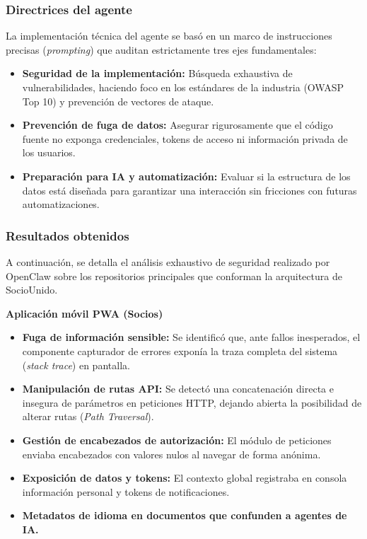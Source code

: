 \documentclass[conference, a4paper]{IEEEtran}
\begin{document}
\subsubsection{Directrices del agente}
La implementaci\'on t\'ecnica del agente se bas\'o en un marco de instrucciones precisas (\textit{prompting}) que auditan estrictamente tres ejes fundamentales:
\begin{itemize}
    \item \textbf{Seguridad de la implementaci\'on:} B\'usqueda exhaustiva de vulnerabilidades, haciendo foco en los est\'andares de la industria (OWASP Top 10) y prevenci\'on de vectores de ataque.
    \item \textbf{Prevenci\'on de fuga de datos:} Asegurar rigurosamente que el c\'odigo fuente no exponga credenciales, tokens de acceso ni informaci\'on privada de los usuarios.
    \item \textbf{Preparaci\'on para IA y automatizaci\'on:} Evaluar si la estructura de los datos est\'a dise\~nada para garantizar una interacci\'on sin fricciones con futuras automatizaciones.
\end{itemize}

\subsubsection{Resultados obtenidos}
A continuaci\'on, se detalla el an\'alisis exhaustivo de seguridad realizado por OpenClaw sobre los repositorios principales que conforman la arquitectura de SocioUnido.

\noindent \textbf{Aplicaci\'on m\'ovil PWA (Socios)}
\begin{itemize}
    \item \textbf{Fuga de informaci\'on sensible:} Se identific\'o que, ante fallos inesperados, el componente capturador de errores expon\'ia la traza completa del sistema (\textit{stack trace}) en pantalla.
    \item \textbf{Manipulaci\'on de rutas API:} Se detect\'o una concatenaci\'on directa e insegura de par\'ametros en peticiones HTTP, dejando abierta la posibilidad de alterar rutas (\textit{Path Traversal}).
    \item \textbf{Gesti\'on de encabezados de autorizaci\'on:} El m\'odulo de peticiones enviaba encabezados con valores nulos al navegar de forma an\'onima.
    \item \textbf{Exposici\'on de datos y tokens:} El contexto global registraba en consola informaci\'on personal y tokens de notificaciones.
    \item \textbf{Metadatos de idioma en documentos que confunden a agentes de IA.}
\end{itemize}
\end{document}
